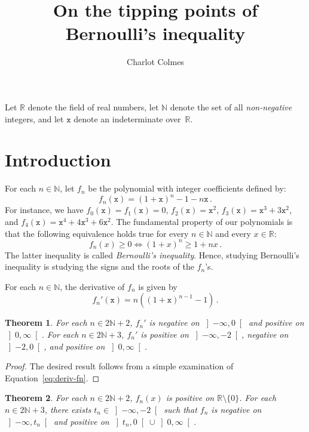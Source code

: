 \documentclass[12pt]{article}
\newcommand{\bR}{\mathbb{R}}
\newcommand{\bN}{\mathbb{N}}
\newcommand{\gtint}[1]{\left] #1, \infty \right[}
\newcommand{\ltint}[1]{\left]- \infty, #1 \right[}
\newcommand{\ttx}{\mathtt{x}}
\newtheorem{theorem}{Theorem}
\begin{document}
\title{On the tipping points of Bernoulli's inequality}
\author{Charlot Colmes}
\maketitle 

\sloppy

Let $\bR$ denote the field of real numbers,
let $\bN$ denote the set of all \emph{non-negative} integers, and 
let $\ttx$ denote an indeterminate over~$\bR$.

\section{Introduction}

For each $n \in \bN$, let $f_n$ be the polynomial with integer coefficients defined by:
\begin{equation} \label{eq:def-fn}
f_n(\ttx) = {(1 + \ttx)}^n - 1 - n \ttx  \,.
\end{equation}
For instance, we have
$f_0(\ttx) = f_1(\ttx) = 0$,
$f_2(\ttx) = \ttx^2$,
$f_3(\ttx) = \ttx^3 + 3 \ttx^2$, and $f_4(\ttx) = \ttx^4 + 4 \ttx^3  + 6 \ttx^2$.
The fundamental property of our polynomials is
that the following equivalence holds true for every $n \in \bN$ and every $x \in \bR$:
$$
f_n(x) \ge 0 \iff {(1 + x)}^n \ge 1 + n x \,.
$$ 
The latter inequality is called \emph{Bernoulli's inequality}.
Hence, studying Bernoulli's inequality is studying the signs and the roots of the $f_n$'s.

For each $n \in \bN$, the derivative of $f_n$ is  given by
\begin{equation} \label{eq:deriv-fn} 
  f_n'(\ttx)  = n \left( {(1 + \ttx)}^{n - 1} -  1 \right) \, .
\end{equation}


\begin{theorem} \label{thm:variation}
   For each $n \in 2 \bN + 2$,
   $f_n'$ is
   negative on $\ltint{0}$ and
   positive on $\gtint{0}$.
   For each $n \in 2 \bN + 3$, $f_n'$ is
   positive on $\ltint{- 2}$,
   negative on $\left]- 2, 0 \right[$, and
   positive on $\gtint{0}$.
 \end{theorem}

 \begin{proof}
   The desired result follows from a simple examination of Equation~\eqref{eq:deriv-fn}.
\end{proof} 

 \begin{theorem}%
   \label{thm:Bernoulli}
   For each $n \in 2 \bN + 2$,
   $f_n(x)$ is positive on $\bR \setminus \{ 0 \}$. 
   For each  $n \in 2 \bN + 3$,
   there exists $t_n \in  \ltint{-2}$
   such that $f_n$ is negative on $\ltint{t_n}$ and positive on $\left]t_n, 0 \right[ \cup \gtint{0}$.
 \end{theorem}
 
\end{document}
